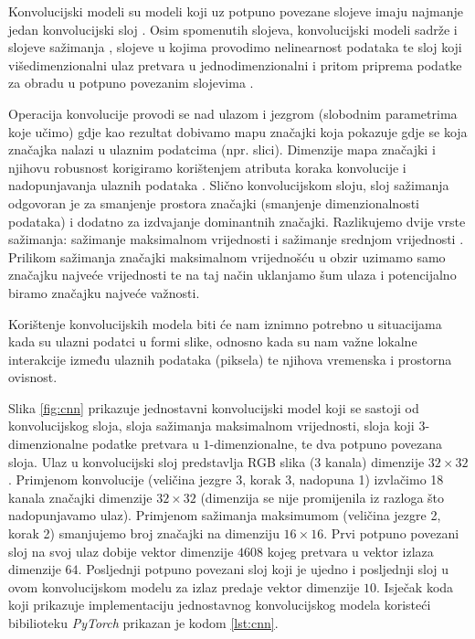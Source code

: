 Konvolucijski modeli  su modeli koji uz potpuno povezane slojeve imaju najmanje jedan konvolucijski sloj . Osim spomenutih slojeva, konvolucijski modeli sadrže i slojeve sažimanja , slojeve u kojima provodimo nelinearnost podataka te sloj koji višedimenzionalni ulaz pretvara u jednodimenzionalni i pritom priprema podatke za obradu u potpuno povezanim slojevima .

Operacija konvolucije provodi se nad ulazom i jezgrom  (slobodnim parametrima koje učimo) gdje kao rezultat dobivamo mapu značajki koja pokazuje gdje se koja značajka nalazi u ulaznim podatcima (npr. slici). Dimenzije mapa značajki i njihovu robusnost korigiramo korištenjem atributa koraka konvolucije  i nadopunjavanja ulaznih podataka . Slično konvolucijskom sloju, sloj sažimanja odgovoran je za smanjenje prostora značajki (smanjenje dimenzionalnosti podataka) i dodatno za izdvajanje dominantnih značajki. Razlikujemo dvije vrste sažimanja: sažimanje maksimalnom vrijednosti  i sažimanje srednjom vrijednosti . Prilikom sažimanja značajki maksimalnom vrijednošću u obzir uzimamo samo značajku najveće vrijednosti te na taj način uklanjamo šum ulaza i potencijalno biramo značajku najveće važnosti.

Korištenje konvolucijskih modela biti će nam iznimno potrebno u situacijama kada su ulazni podatci u formi slike, odnosno kada su nam važne lokalne interakcije između ulaznih podataka (piksela) te njihova vremenska i prostorna ovisnost.

Slika \ref{fig:cnn} \cite{NNsvg} prikazuje jednostavni konvolucijski model koji se sastoji od konvolucijskog sloja, sloja sažimanja maksimalnom vrijednosti, sloja koji $3$-dimenzionalne podatke pretvara u $1$-dimenzionalne, te dva potpuno povezana sloja. Ulaz u konvolucijski sloj predstavlja RGB slika (3 kanala) dimenzije $32 \times 32$. Primjenom konvolucije (veličina jezgre 3, korak 3, nadopuna 1) izvlačimo 18 kanala značajki dimenzije $32 \times 32$ (dimenzija se nije promijenila iz razloga što nadopunjavamo ulaz). Primjenom sažimanja maksimumom (veličina jezgre 2, korak 2) smanjujemo broj značajki na dimenziju $16 \times 16$. Prvi potpuno povezani sloj na svoj ulaz dobije vektor dimenzije $4608$ kojeg pretvara u vektor izlaza dimenzije $64$. Posljednji potpuno povezani sloj koji je ujedno i posljednji sloj u ovom konvolucijskom modelu za izlaz predaje vektor dimenzije $10$. Isječak koda koji prikazuje implementaciju jednostavnog konvolucijskog modela koristeći bibilioteku \textit{PyTorch} prikazan je kodom \ref{lst:cnn}.

